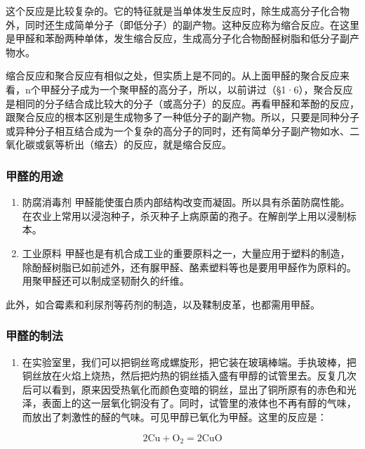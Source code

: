 这个反应是比较复杂的。它的特征就是当单体发生反应时，除生成高分子化合物外，同时还生成简单分子（即低分子）的副产物。这种反应称为缩合反应。在这里是甲醛和苯酚两种单体，发生缩合反应，生成高分子化合物酚醛树脂和低分子副产物水。

缩合反应和聚合反应有相似之处，但实质上是不同的。从上面甲醛的聚合反应来看，n个甲醛分子成为一个聚甲醛的高分子，所以，以前讲过（§1·6），聚合反应是相同的分子结合成比较大的分子（或高分子）的反应。再看甲醛和苯酚的反应，跟聚合反应的根本区别是生成物多了一种低分子的副产物。所以，只要是同种分子或异种分子相互结合成为一个复杂的高分子的同时，还有简单分子副产物如水、二氧化碳或氨等析出（缩去）的反应，就是缩合反应。

\subsubsection{甲醛的用途}

\begin{enumerate}
\item
  防腐消毒剂
  甲醛能使蛋白质内部结构改变而凝固。所以具有杀菌防腐性能。在农业上常用以浸泡种子，杀灭种子上病原菌的孢子。在解剖学上用以浸制标本。
\item
  工业原料
  甲醛也是有机合成工业的重要原料之一，大量应用于塑料的制造，除酚醛树脂已如前述外，还有脲甲醛、酪素塑料等也是要用甲醛作为原料的。用聚甲醛还可以制成坚韧耐久的纤维。
\end{enumerate}

此外，如合霉素和利尿剂等药剂的制造，以及鞣制皮革，也都需用甲醛。

\subsubsection{甲醛的制法}

\begin{enumerate}
\item
  在实验室里，我们可以把铜丝弯成螺旋形，把它装在玻璃棒端。手执玻棒，把铜丝放在火焰上烧热，然后把灼热的铜丝插入盛有甲醇的试管里去。反复几次后可以看到，原来因受热氧化而颜色变暗的铜丝，显出了铜所原有的赤色和光泽，表面上的这一层氧化铜没有了。同时，试管里的液体也不再有醇的气味，而放出了刺激性的醛的气味。可见甲醇已氧化为甲醛。这里的反应是：
\end{enumerate}

\[
2 \mathrm{Cu} + \mathrm{O} _ {2} = 2 \mathrm{CuO}
\]

